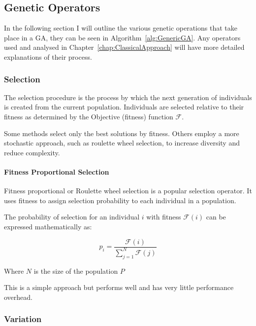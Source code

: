 \subsection{Genetic Operators}

In the following section I will outline the various genetic operations that take place in a GA, they can be seen in Algorithm~\ref{alg:GenericGA}. Any operators used and analysed in Chapter~\ref{chap:ClassicalApproach} will have more detailed explanations of their process.

\subsubsection{Selection}

The selection procedure is the process by which the next generation of individuals is created from the current population. Individuals are selected relative to their fitness as determined by the Objective (fitness) function $\mathcal{F}$. 

Some methods select only the best solutions by fitness. Others employ a more stochastic approach, such as roulette wheel selection, to increase diversity and reduce complexity.

\paragraph{Fitness Proportional Selection}\label{imp:FitPropSel}

Fitness proportional or Roulette wheel selection is a popular selection operator. It uses fitness to assign selection probability to each individual in a population.

The probability of selection for an individual $i$ with fitness $\mathcal{F}(i)$ can be expressed mathematically as:

\begin{equation}
    p_i = \frac{\mathcal{F}(i)}{ \sum^{N}_{j=1} \mathcal{F}(j)} 
\end{equation}

Where $N$ is the size of the population $P$

This is a simple approach but performs well and has very little performance overhead.  

\subsubsection{Variation}

